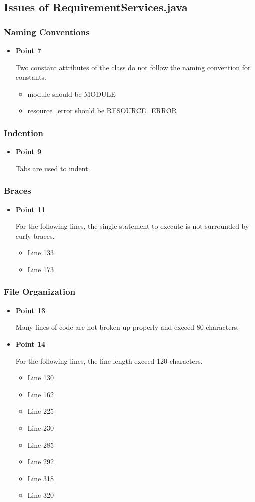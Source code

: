 \documentclass[a4paper,11pt]{article}
\begin{document}
	\subsection{Issues of RequirementServices.java}
	\subsubsection{Naming Conventions}
	\begin{itemize}
	\item \textbf{Point 7} 
	
	Two constant attributes of the class do not follow the naming convention for constants.
		\begin{itemize}
			\item module should be MODULE
			\item resource\_error should be RESOURCE\_ERROR
		\end{itemize}
	\end{itemize}
	\subsubsection{Indention}
	\begin{itemize}
	\item \textbf{Point 9} 
	
	Tabs are used to indent.
	\end{itemize}
	\subsubsection{Braces}
	\begin{itemize}
	\item \textbf{Point 11} 
	
	For the following lines, the single statement to execute is not surrounded by curly braces.
	\begin{itemize}
	\item Line 133
	\item Line 173
	\end{itemize}
	\end{itemize}
	\subsubsection{File Organization}
	\begin{itemize}
	\item \textbf{Point 13} 
	
	Many lines of code are not broken up properly and exceed 80 characters.
	\item \textbf{Point 14} 
	
	For the following lines, the line length exceed 120 characters.
	\begin{itemize}
		\item Line 130
		\item Line 162
		\item Line 225
		\item Line 230
		\item Line 285
		\item Line 292
		\item Line 318
		\item Line 320
	\end{itemize}
	\end{itemize}
\end{document}
